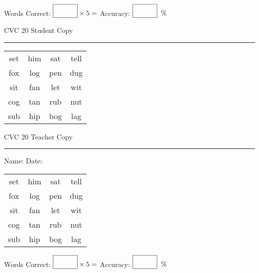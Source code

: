 \documentclass{memoir}
\begin{document}
\normalsize

Words Correct: $\fbox{\phantom{\huge 100}} \times 5 = $ Accuracy: $\fbox{\phantom{\huge 100}}\;\; \%$ 

\vfill

\newpage



\footnotesize \noindent
CVC 20 \hfill Student Copy
\smallskip
\hrule

\huge

\setlength{\tabcolsep}{14pt}
\def\arraystretch{2}

{\selectfont


\begin{vplace}[0.5]
\begin{center}
\begin{tabular}{cccc}
set & him & sat & tell \\
fox & log & pen & dug \\
sit & fan & let & wit \\
cog & tan & rub & nut \\
sub & hip & bog & lag \\
\end{tabular}
\end{center}
\end{vplace}

}

\newpage

\footnotesize \noindent
CVC 20 \hfill Teacher Copy
\smallskip
\hrule

\normalsize

\vfill

\noindent
Name: \underline{\hspace{1.75in}} \hfill Date: \underline{\hspace{1in}}

\huge

{\selectfont


\begin{vplace}[0.5]
\begin{center}
\begin{tabular}{cccc}
set & him & sat & tell \\
fox & log & pen & dug \\
sit & fan & let & wit \\
cog & tan & rub & nut \\
sub & hip & bog & lag \\
\end{tabular}
\end{center}
\end{vplace}



}

\normalsize

Words Correct: $\fbox{\phantom{\huge 100}} \times 5 = $ Accuracy: $\fbox{\phantom{\huge 100}}\;\; \%$ 

\vfill

\end{document}

